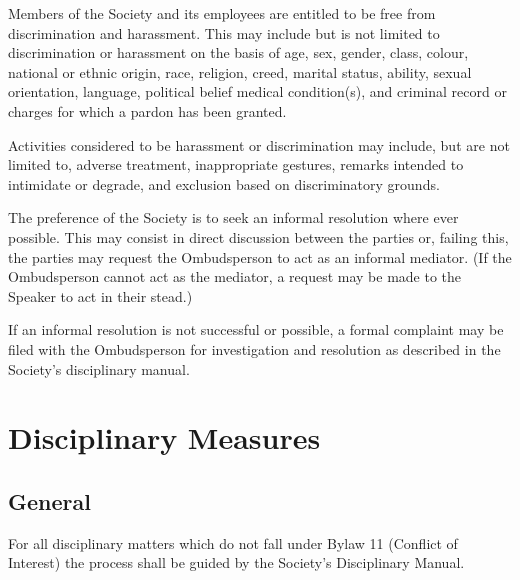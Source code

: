 \begin{longenum}[ label*=\thesection.\arabic*., align=left]
	\item Members of the Society and its employees are entitled to be free from discrimination and harassment. This may include but is not limited to discrimination or harassment on the basis of age, sex, gender, class, colour, national or ethnic origin, race, religion, creed, marital status, ability, sexual orientation, language, political belief medical condition(s), and criminal record or charges for which a pardon has been granted.


\item Activities considered to be harassment or discrimination may include, but are not limited to, adverse treatment, inappropriate gestures, remarks intended to intimidate or degrade, and exclusion based on discriminatory grounds.



\item The preference of the Society is to seek an informal resolution where ever possible. This may consist in direct discussion between the parties or, failing this, the parties may request the Ombudsperson to act as an informal mediator. (If the Ombudsperson cannot act as the mediator, a request may be made to the Speaker to act in their stead.)


\item If an informal resolution is not successful or possible, a formal complaint may be filed with the Ombudsperson for investigation and resolution as described in the Society's disciplinary manual.

\end{longenum}

\newpage

\section{Disciplinary Measures}
\subsection {General}
\begin{longenum}[ label*=\thesubsection.\arabic*., align=left] 
\item For all disciplinary matters which do not fall under Bylaw 11 (Conflict of Interest) the process shall be guided by the Society's Disciplinary Manual.
\end{longenum}
